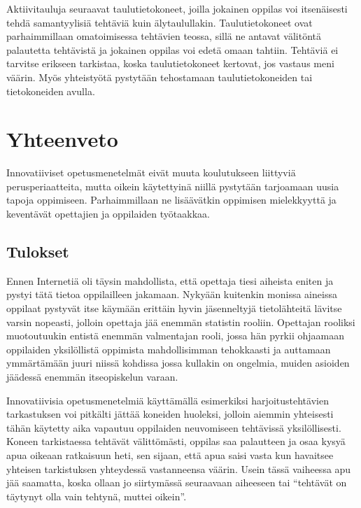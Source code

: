 \documentclass[utf8,bachelor]{gradu3}
\begin{document}
Aktiivitauluja seuraavat taulutietokoneet, joilla jokainen oppilas voi itsenäisesti tehdä samantyylisiä tehtäviä kuin älytaulullakin. Taulutietokoneet ovat parhaimmillaan omatoimisessa tehtävien teossa, sillä ne antavat välitöntä palautetta tehtävistä ja jokainen oppilas voi edetä omaan tahtiin. Tehtäviä ei tarvitse erikseen tarkistaa, koska taulutietokoneet kertovat, jos vastaus meni väärin. Myös yhteistyötä pystytään tehostamaan taulutietokoneiden tai tietokoneiden avulla.


\chapter{Yhteenveto}
Innovatiiviset opetusmenetelmät eivät muuta koulutukseen liittyviä perusperiaatteita, mutta oikein käytettyinä niillä pystytään tarjoamaan uusia tapoja oppimiseen. Parhaimmillaan ne lisäävätkin oppimisen mielekkyyttä ja keventävät opettajien ja oppilaiden työtaakkaa.

\section{Tulokset}
Ennen Internetiä oli täysin mahdollista, että opettaja tiesi aiheista eniten ja pystyi tätä tietoa oppilailleen jakamaan. Nykyään kuitenkin monissa aineissa oppilaat pystyvät itse käymään erittäin hyvin jäsenneltyjä tietolähteitä lävitse varsin nopeasti, jolloin opettaja jää enemmän statistin rooliin. Opettajan rooliksi muotoutuukin entistä enemmän valmentajan rooli, jossa hän pyrkii ohjaamaan oppilaiden yksilöllistä oppimista mahdollisimman tehokkaasti ja auttamaan ymmärtämään juuri niissä kohdissa jossa kullakin on ongelmia, muiden asioiden jäädessä enemmän itseopiskelun varaan.

Innovatiivisia opetusmenetelmiä käyttämällä esimerkiksi harjoitustehtävien tarkastuksen voi pitkälti jättää koneiden huoleksi, jolloin aiemmin yhteisesti tähän käytetty aika vapautuu oppilaiden neuvomiseen tehtävissä yksilöllisesti. Koneen tarkistaessa tehtävät välittömästi, oppilas saa palautteen ja osaa kysyä apua oikeaan ratkaisuun heti, sen sijaan, että apua saisi vasta kun havaitsee yhteisen tarkistuksen yhteydessä vastanneensa väärin. Usein tässä vaiheessa apu jää saamatta, koska ollaan jo siirtymässä seuraavaan aiheeseen tai “tehtävät on täytynyt olla vain tehtynä, muttei oikein”.
\end{document}
